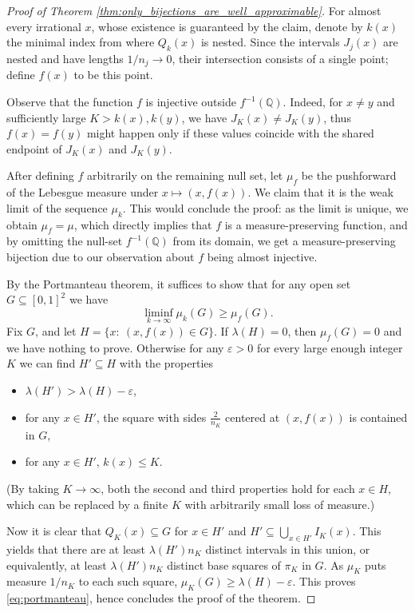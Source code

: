 \documentclass{article}
\theoremstyle{definition}
\begin{document}
\begin{proof}[Proof of Theorem \ref{thm:only_bijections_are_well_approximable}]
    For almost every irrational $x$, whose existence is guaranteed by the claim, denote by $k(x)$ the minimal index from where $Q_k(x)$ is nested. Since the intervals \(J_j(x)\) are nested and have lengths \(1/n_j\to0\), their intersection consists of a single point; define \(f(x)\) to be this point.
     
    Observe that the function \(f\) is injective outside \(f^{-1}(\mathbb Q)\). Indeed, for $x\neq y$ and sufficiently large $K>k(x), k(y)$, we have $J_K(x)\neq J_K(y)$, thus $f(x)=f(y)$ might happen only if these values coincide with the shared endpoint of $J_K(x)$ and $J_K(y)$.
    
    After defining \(f\) arbitrarily on the remaining null set, let \(\mu_f\) be the pushforward of the Lebesgue measure under \(x\mapsto(x,f(x))\). We claim that it is the weak limit of the sequence $\mu_{k}$. This would conclude the proof: as the limit is unique, we obtain $\mu_f = \mu$, which directly implies that $f$ is a measure-preserving function, and by omitting the null-set $f^{-1}(\mathbb{Q})$ from its domain, we get a measure-preserving bijection due to our observation about $f$ being almost injective.

    By the Portmanteau theorem, it suffices to show that for any open set $G\subseteq [0, 1]^2$ we have
    \begin{equation}\label{eq:portmanteau}
    \liminf_{k\to\infty} \mu_k(G)\geq \mu_f(G).
    \end{equation}
    Fix $G$, and let $H=\{x:\ (x, f(x))\in G\}$. If $\lambda(H)=0$, then $\mu_f(G)=0$ and we have nothing to prove. Otherwise for any $\varepsilon>0$ for every large enough integer $K$ we can find $H'\subseteq H$ with the properties 
    \begin{itemize}
    \item $\lambda(H')>\lambda(H)-\varepsilon$,
    \item for any $x\in H'$, the square with sides $\frac{2}{n_K}$ centered at $(x, f(x))$ is contained in $G$,
    \item for any $x\in H'$, $k(x)\leq K$.
    \end{itemize}
    (By taking $K\to \infty$, both the second and third properties hold for each $x\in H$, which can be replaced by a finite $K$ with arbitrarily small loss of measure.)

    Now it is clear that $Q_K(x)\subseteq G$ for $x\in H'$ and $H'\subseteq \bigcup_{x\in H'} I_K(x)$. This yields that there are at least $\lambda(H')n_K$ distinct intervals in this union, or equivalently, at least $\lambda(H')n_K$ distinct base squares of $\pi_K$ in $G$. As $\mu_K$ puts measure $1/n_K$ to each such square, $\mu_K(G)\geq \lambda(H)-\varepsilon$. This proves \eqref{eq:portmanteau}, hence concludes the proof of the theorem.
    
\end{proof}
\end{document}
